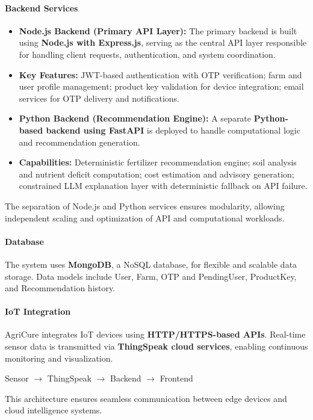 \documentclass[conference]{IEEEtran}
\begin{document}
\paragraph{Backend Services}
\begin{itemize}
\item \textbf{Node.js Backend (Primary API Layer):} The primary backend is built using \textbf{Node.js with Express.js}, serving as the central API layer responsible for handling client requests, authentication, and system coordination.
\item \textbf{Key Features:} JWT-based authentication with OTP verification; farm and user profile management; product key validation for device integration; email services for OTP delivery and notifications.
\item \textbf{Python Backend (Recommendation Engine):} A separate \textbf{Python-based backend using FastAPI} is deployed to handle computational logic and recommendation generation.
\item \textbf{Capabilities:} Deterministic fertilizer recommendation engine; soil analysis and nutrient deficit computation; cost estimation and advisory generation; constrained LLM explanation layer with deterministic fallback on API failure.
\end{itemize}
The separation of Node.js and Python services ensures modularity, allowing independent scaling and optimization of API and computational workloads.

\paragraph{Database}
The system uses \textbf{MongoDB}, a NoSQL database, for flexible and scalable data storage. Data models include User, Farm, OTP and PendingUser, ProductKey, and Recommendation history.

\paragraph{IoT Integration}
AgriCure integrates IoT devices using \textbf{HTTP/HTTPS-based APIs}. Real-time sensor data is transmitted via \textbf{ThingSpeak cloud services}, enabling continuous monitoring and visualization.
\begin{center}
Sensor $\rightarrow$ ThingSpeak $\rightarrow$ Backend $\rightarrow$ Frontend
\end{center}
This architecture ensures seamless communication between edge devices and cloud intelligence systems.
\end{document}
